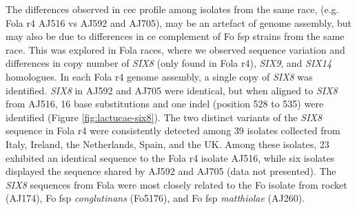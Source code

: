 The differences observed in \ac{cec} profile among isolates from the same race, (e.g. \ac{Fola} \ac{r4} AJ516 vs AJ592 and AJ705), may be an artefact of genome assembly, but may also be due to differences in \ac{ce} complement of \ac{Fo} \ac{fsp} strains from the same race. This was explored in  \ac{Fola} races, where we observed sequence variation and differences in copy number of \textit{SIX8} (only found in \ac{Fola} \ac{r4}), \textit{SIX9}, and \textit{SIX14} homologues. In each \ac{Fola} \ac{r4} genome assembly, a single copy of \textit{SIX8} was identified. \textit{SIX8} in AJ592 and AJ705 were identical, but when aligned to \textit{SIX8} from AJ516, 16 base substitutions and one indel (position 528 to 535) were identified (Figure \ref{fig:lactucae-six8}). The two distinct variants of the \textit{SIX8} sequence in \ac{Fola} \ac{r4} were consistently detected among 39 isolates collected from Italy, Ireland, the Netherlands, Spain, and the UK. Among these isolates, 23 exhibited an identical sequence to the \ac{Fola} \ac{r4} isolate AJ516, while six isolates displayed the sequence shared by AJ592 and AJ705 (data not presented). The \textit{SIX8} sequences from \ac{Fola} were  most closely related to the \ac{Fo} isolate from rocket (AJ174), \ac{Fo} \ac{fsp} \textit{conglutinans} (Fo5176), and \ac{Fo} \ac{fsp} \textit{matthiolae} (AJ260).

